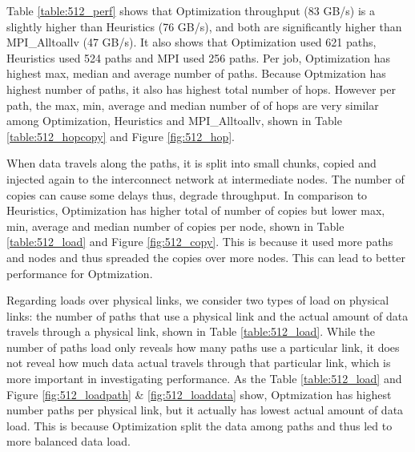 \documentclass[letter]{article}
\begin{document}
Table \ref{table:512_perf} shows that Optimization throughput (83 GB/s) is a slightly higher than Heuristics (76 GB/s), and both are significantly higher than MPI\_Alltoallv (47 GB/s). It also shows that Optimization used 621 paths, Heuristics used 524 paths and MPI used 256 paths. Per job, Optimization has highest max, median and average number of paths. Because Optmization has highest number of paths, it also has highest total number of hops. However per path, the max, min, average and median number of of hops are very similar among Optimization, Heuristics and MPI\_Alltoallv, shown in Table \ref{table:512_hopcopy} and Figure \ref{fig:512_hop}. 

When data travels along the paths, it is split into small chunks, copied and injected again to the interconnect network at intermediate nodes. The number of copies can cause some delays thus, degrade throughput. In comparison to Heuristics, Optimization has higher total of number of copies but lower max, min, average and median number of copies per node, shown in Table \ref{table:512_load} and Figure \ref{fig:512_copy}. This is because it used more paths and nodes and thus spreaded the copies over more nodes. This can lead to better performance for Optmization.

Regarding loads over physical links, we consider two types of load on physical links: the number of paths that use a physical link and the actual amount of data travels through a physical link, shown in Table \ref{table:512_load}. While the number of paths load only reveals how many paths use a particular link, it does not reveal how much data actual travels through that particular link, which is more important in investigating performance. As the Table \ref{table:512_load} and Figure \ref{fig:512_loadpath} \& \ref{fig:512_loaddata}  show, Optmization has highest number paths per physical link, but it actually has lowest actual amount of data load. This is because Optimization split the data among paths and thus led to more balanced data load.
\end{document}
